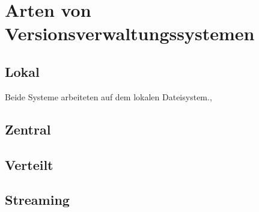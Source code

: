 \section{Arten von Versionsverwaltungssystemen}
\subsection{Lokal}
Beide Systeme arbeiteten auf dem lokalen
Dateisystem.,
\subsection{Zentral}
\subsection{Verteilt}
\subsection{Streaming}

\label{sec:why}

